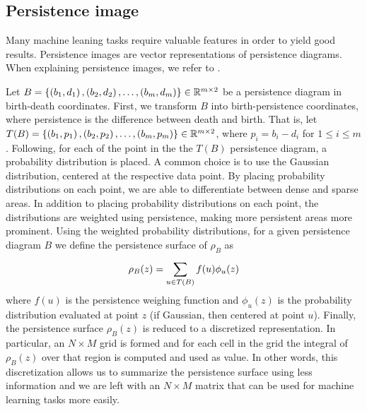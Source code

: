 \subsection{Persistence image}
\label{sec:persistence-image}
Many machine leaning tasks require valuable features in order to yield good results. Persistence images \cite{adams2016persistence} are vector representations of persistence diagrams. When explaining persistence images, we refer to \cite{adams2016persistence}.

Let $B = \left\{\left(b_1, d_1\right), \left(b_2, d_2\right), \ldots, \left(b_m, d_m\right)\right\} \in \mathbb{R}^{m \times 2}$ be a persistence diagram in birth-death coordinates. First, we transform $B$ into birth-persistence coordinates, where persistence is the difference between death and birth. That is, let $T(B) = \left\{\left(b_1, p_1\right), \left(b_2, p_2\right), \ldots, \left(b_m, p_m\right)\right\} \in \mathbb{R}^{m \times 2}$, where $p_i = b_i - d_i$ for $1 \leq i \leq m$. Following, for each of the point in the the $T(B)$ persistence diagram, a probability distribution is placed. A common choice is to use the Gaussian distribution, centered at the respective data point. By placing probability distributions on each point, we are able to differentiate between dense and sparse areas. In addition to placing probability distributions on each point, the distributions are weighted using persistence, making more persistent areas more prominent. Using the weighted probability distributions, for a given persistence diagram $B$ we define the persistence surface of $\rho_B$ as
\begin{align}
    \rho_B(z) = \sum\limits_{u \in T(B)}^{} f(u) \phi_u(z)
\end{align}
where $f(u)$ is the persistence weighing function and $\phi_u(z)$ is the probability distribution evaluated at point $z$ (if Gaussian, then centered at point $u$). Finally, the persistence surface $\rho_B(z)$ is reduced to a discretized representation. In particular, an $N \times M$ grid is formed and for each cell in the grid the integral of $\rho_B(z)$ over that region is computed and used as value. In other words, this discretization allows us to summarize the persistence surface using less information and we are left with an $N \times M$ matrix that can be used for machine learning tasks more easily.

